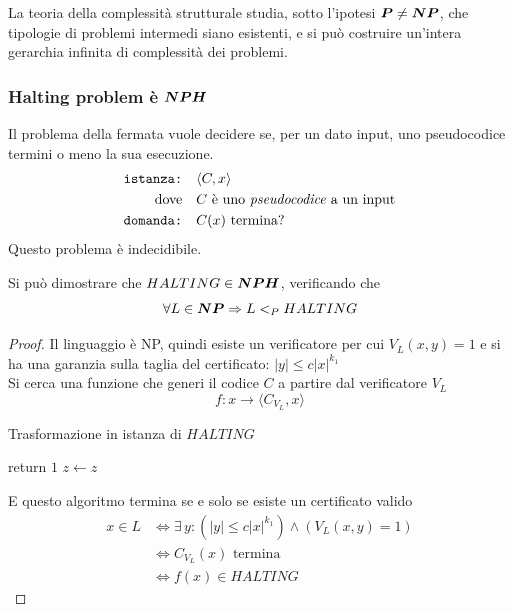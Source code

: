 La teoria della complessità strutturale studia, sotto l'ipotesi $\bm{P} \ne \bm{NP}$, che tipologie di problemi intermedi siano esistenti, e si può costruire un'intera gerarchia infinita di complessità dei problemi.

\subsubsection{Halting problem è $\bm{NPH}$}

Il problema della fermata vuole decidere se, per un dato input, uno pseudocodice termini o meno la sua esecuzione.
\begin{align*}
    \texttt{istanza:} \quad & \langle C, x \rangle
    \\
    \text{dove} \quad & C \text{ è uno \emph{pseudocodice} a un input}
    \\
    \texttt{domanda:} \quad & C (x) \text{ termina?}
\end{align*}
Questo problema è indecidibile.

Si può dimostrare che $HALTING \in \bm{NPH}$, verificando che
\begin{equation*}
    \forall L \in \bm{NP}
    \Rightarrow
    L <_P HALTING
\end{equation*}
\begin{proof}
    Il linguaggio è NP, quindi esiste un verificatore per cui $
    V_L ( x,y ) = 1
    $ e si ha una garanzia sulla taglia del certificato: $|y| \leq c |x|^{k_1}$
    \\
    Si cerca una funzione che generi il codice $C$ a partire dal verificatore $V_L$
    \begin{equation*}
        f : x \to \langle C_{V_L},x \rangle
    \end{equation*}
    \begin{algorithm}[H]
        \caption{Trasformazione in istanza di $HALTING$}\label{alg:trasfhalt}
        \begin{algorithmic}[1]
            \State return $1$
            \EndIf
            \EndFor
            \State $z \gets z$
            \EndWhile
            \EndProcedure
        \end{algorithmic}
    \end{algorithm}
    \noindent
    E questo algoritmo termina se e solo se esiste un certificato valido
    \begin{align*}
        x \in L
        & \Leftrightarrow
        \exists \, y : 
        \left( 
            |y| \leq c |x|^{k_1}
        \right)
        \wedge
        \left( 
            V_L ( x,y ) = 1
        \right)
        \\
        & \Leftrightarrow
        C_{V_L} (x)
        \text{ termina}
        \\
        & \Leftrightarrow
        f(x) \in HALTING
    \end{align*}
\end{proof}


